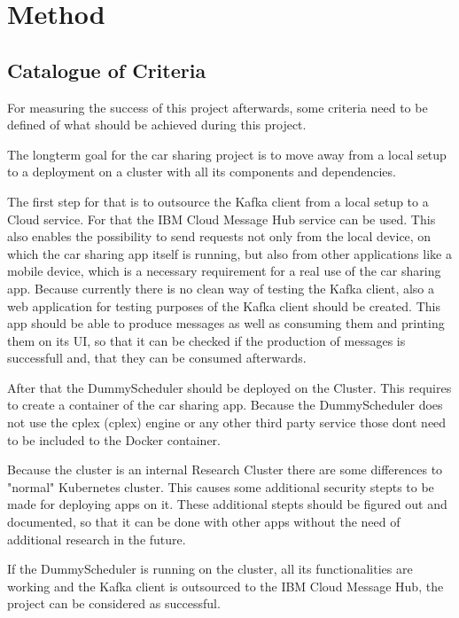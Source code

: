 
\chapter{Method}

\section{Catalogue of Criteria}

For measuring the success of this project afterwards, some criteria need to be defined of what should be achieved during this project.

The longterm goal for the car sharing project is to move away from a local setup to a deployment on a cluster with all its components and dependencies.

The first step for that is to outsource the Kafka client from a local setup to a Cloud service. For that the IBM Cloud Message Hub service can be used. This also enables the possibility to send requests not only from the local device, on which the car sharing app itself is running, but also from other applications like a mobile device, which is a necessary requirement for a real use of the car sharing app. Because currently there is no clean way of testing the Kafka client, also a web application for testing purposes of the Kafka client should be created. This app should be able to produce messages as well as consuming them and printing them on its UI, so that it can be checked if the production of messages is successfull and, that they can be consumed afterwards.

After that the DummyScheduler should be deployed on the Cluster. This requires to create a container of the car sharing app. Because the DummyScheduler does not use the \acs{cplex} (\acl{cplex}) engine or any other third party service those dont need to be included to the Docker container.

Because the cluster is an internal Research Cluster there are some differences to "normal" Kubernetes cluster. This causes some additional security stepts to be made for deploying apps on it. These additional stepts should be figured out and documented, so that it can be done with other apps without the need of additional research in the future.

If the DummyScheduler is running on the cluster, all its functionalities are working and the Kafka client is outsourced to the IBM Cloud Message Hub, the project can be considered as successful.

